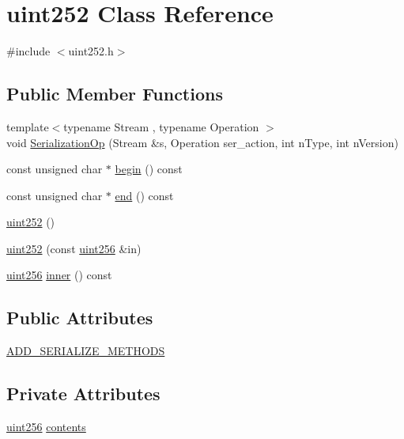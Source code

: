 \hypertarget{classuint252}{}\section{uint252 Class Reference}
\label{classuint252}


{\ttfamily \#include $<$uint252.\+h$>$}

\subsection*{Public Member Functions}
\begin{DoxyCompactItemize}
\item 
{\footnotesize template$<$typename Stream , typename Operation $>$ }\\void \mbox{\hyperlink{classuint252_a424a69052206106ea1f8e5b31ee59248}{Serialization\+Op}} (Stream \&s, Operation ser\+\_\+action, int n\+Type, int n\+Version)
\item 
const unsigned char $\ast$ \mbox{\hyperlink{classuint252_aecef4074b301a7274b2190d77333aa8e}{begin}} () const
\item 
const unsigned char $\ast$ \mbox{\hyperlink{classuint252_ac46520a9447f4aef329e239f63ecf98f}{end}} () const
\item 
\mbox{\hyperlink{classuint252_a1c1e7b58c526400f4f4a49d8583c3362}{uint252}} ()
\item 
\mbox{\hyperlink{classuint252_a7ea8b4bf97422fbd8900270f4f2f24cb}{uint252}} (const \mbox{\hyperlink{classuint256}{uint256}} \&in)
\item 
\mbox{\hyperlink{classuint256}{uint256}} \mbox{\hyperlink{classuint252_ac8ebb65ad534ef0aff44405b0c639c24}{inner}} () const
\end{DoxyCompactItemize}
\subsection*{Public Attributes}
\begin{DoxyCompactItemize}
\item 
\mbox{\hyperlink{classuint252_aa85cac05ed076c3c3f9096371f4b5529}{A\+D\+D\+\_\+\+S\+E\+R\+I\+A\+L\+I\+Z\+E\+\_\+\+M\+E\+T\+H\+O\+DS}}
\end{DoxyCompactItemize}
\subsection*{Private Attributes}
\begin{DoxyCompactItemize}
\item 
\mbox{\hyperlink{classuint256}{uint256}} \mbox{\hyperlink{classuint252_a2b9583b22a7e40620e65dd05d68e6ebf}{contents}}
\end{DoxyCompactItemize}

